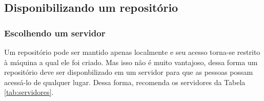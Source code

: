 \subsection{Disponibilizando um repositório}

\subsubsection{Escolhendo um servidor}

Um repositório pode ser mantido apenas localmente e seu acesso torna-se restrito à máquina a qual ele foi criado. Mas isso não é muito vantajoso, dessa forma um repositório deve ser disponbilizado em um servidor para que as pessoas possam acessá-lo de qualquer lugar. Dessa forma, \cite{svn-book} recomenda os servidores da Tabela \ref{tab:servidores}.

